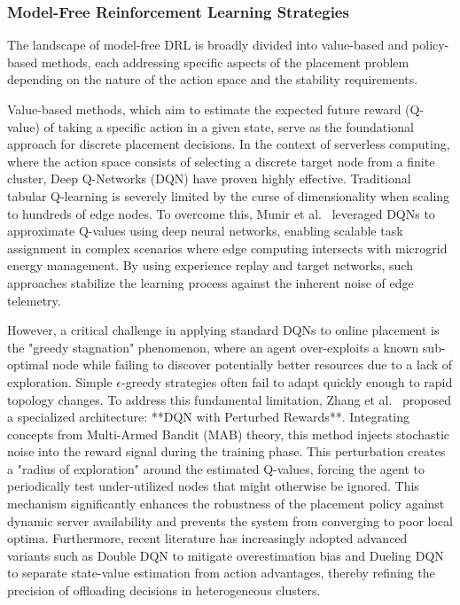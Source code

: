 \documentclass[lettersize,journal]{IEEEtran}
\begin{document}
\subsubsection{Model-Free Reinforcement Learning Strategies}
The landscape of model-free DRL is broadly divided into value-based and policy-based methods, each addressing specific aspects of the placement problem depending on the nature of the action space and the stability requirements.

Value-based methods, which aim to estimate the expected future reward (Q-value) of taking a specific action in a given state, serve as the foundational approach for discrete placement decisions. In the context of serverless computing, where the action space consists of selecting a discrete target node from a finite cluster, Deep Q-Networks (DQN) have proven highly effective. Traditional tabular Q-learning is severely limited by the curse of dimensionality when scaling to hundreds of edge nodes. To overcome this, Munir et al.~\cite{munir2019Edge} leveraged DQNs to approximate Q-values using deep neural networks, enabling scalable task assignment in complex scenarios where edge computing intersects with microgrid energy management. By using experience replay and target networks, such approaches stabilize the learning process against the inherent noise of edge telemetry.

However, a critical challenge in applying standard DQNs to online placement is the "greedy stagnation" phenomenon, where an agent over-exploits a known sub-optimal node while failing to discover potentially better resources due to a lack of exploration. Simple $\epsilon$-greedy strategies often fail to adapt quickly enough to rapid topology changes. To address this fundamental limitation, Zhang et al.~\cite{zhang2023Perturbed} proposed a specialized architecture: **DQN with Perturbed Rewards**. Integrating concepts from Multi-Armed Bandit (MAB) theory, this method injects stochastic noise into the reward signal during the training phase. This perturbation creates a "radius of exploration" around the estimated Q-values, forcing the agent to periodically test under-utilized nodes that might otherwise be ignored. This mechanism significantly enhances the robustness of the placement policy against dynamic server availability and prevents the system from converging to poor local optima. Furthermore, recent literature has increasingly adopted advanced variants such as Double DQN to mitigate overestimation bias and Dueling DQN to separate state-value estimation from action advantages, thereby refining the precision of offloading decisions in heterogeneous clusters.
\end{document}
